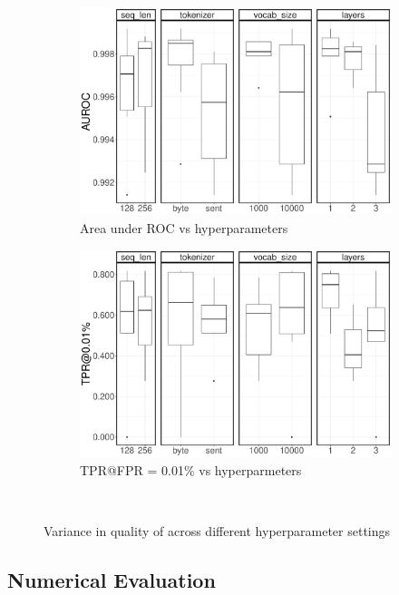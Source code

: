 \begin{figure}
\begin{subfigure}{0.48\linewidth}
	\centering
\includegraphics[width=0.95\linewidth]{urltran/figures/roc_hyperparams}
\caption{Area under ROC vs hyperparameters}
\label{fig:urltran:pretrain_scratch:roc}
\end{subfigure}
\begin{subfigure}{0.48\linewidth}
	\centering
\includegraphics[width=0.95\linewidth]{urltran/figures/tpr_0.01_hyperparams}
\caption{TPR@FPR = 0.01\% vs hyperparmeters}
\label{fig:urltran:pretrain_scratch:tpr}
\end{subfigure}
\caption{Variance in quality of \URLTranSysc across different hyperparameter settings}\
\label{fig:urltran:pretrain_scratch}
\end{figure}


\subsection{Numerical Evaluation}


